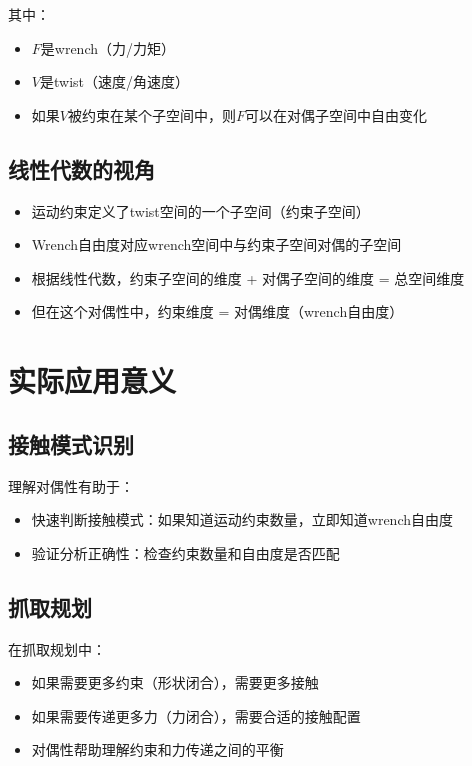 \documentclass[12pt,a4paper]{article}
\begin{document}
其中：
\begin{itemize}
    \item $F$是wrench（力/力矩）
    \item $V$是twist（速度/角速度）
    \item 如果$V$被约束在某个子空间中，则$F$可以在对偶子空间中自由变化
\end{itemize}

\subsection{线性代数的视角}

\begin{itemize}
    \item 运动约束定义了twist空间的一个子空间（约束子空间）
    \item Wrench自由度对应wrench空间中与约束子空间对偶的子空间
    \item 根据线性代数，约束子空间的维度 + 对偶子空间的维度 = 总空间维度
    \item 但在这个对偶性中，约束维度 = 对偶维度（wrench自由度）
\end{itemize}

\section{实际应用意义}

\subsection{接触模式识别}

理解对偶性有助于：
\begin{itemize}
    \item 快速判断接触模式：如果知道运动约束数量，立即知道wrench自由度
    \item 验证分析正确性：检查约束数量和自由度是否匹配
\end{itemize}

\subsection{抓取规划}

在抓取规划中：
\begin{itemize}
    \item 如果需要更多约束（形状闭合），需要更多接触
    \item 如果需要传递更多力（力闭合），需要合适的接触配置
    \item 对偶性帮助理解约束和力传递之间的平衡
\end{itemize}
\end{document}
